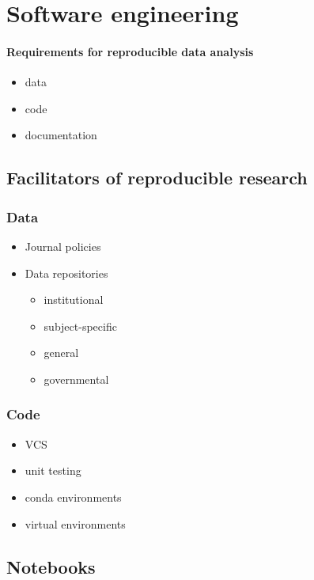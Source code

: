 \documentclass{article}
\begin{document}
\section{Software engineering}


\paragraph{Requirements for reproducible data analysis}

\begin{itemize}
	\item data
	\item code 
	\item documentation
\end{itemize}

\subsection{Facilitators of reproducible research}

\subsubsection{Data}
\begin{itemize}
	\item Journal policies
	\item Data repositories \begin{itemize}
		\item institutional
		\item subject-specific
		\item general
		\item governmental
	\end{itemize}
\end{itemize}


\subsubsection{Code}

\begin{itemize}
	\item VCS
	\item unit testing
	\item conda environments
	\item virtual environments
\end{itemize}

\subsection{Notebooks}
\end{document}
